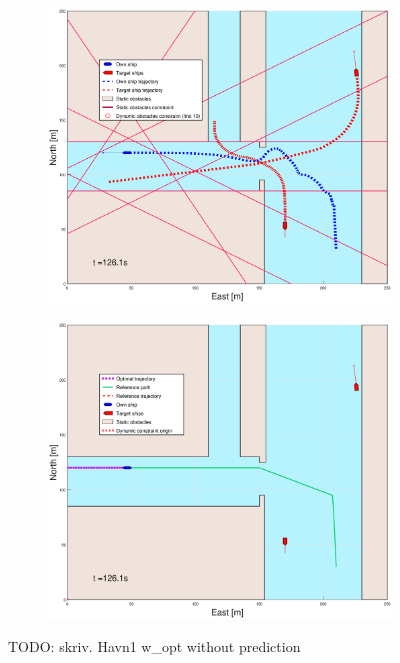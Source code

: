 \begin{figure}[ht]\ContinuedFloat
    \begin{subfigure}[b]{0.49\textwidth}
        \centering
        \includegraphics[width=\textwidth]{Images/Figures/Havn1/_Simple_1fig1_time=126}
    \end{subfigure}
    \hfill
    \begin{subfigure}[b]{0.499\textwidth}
        \centering
        \includegraphics[width=\textwidth]{Images/Figures/Havn1/_Simple_1fig999_time=126}
    \end{subfigure}
    \hfill
    \caption{TODO: skriv. Havn1 w\_opt without prediction}
\end{figure}

